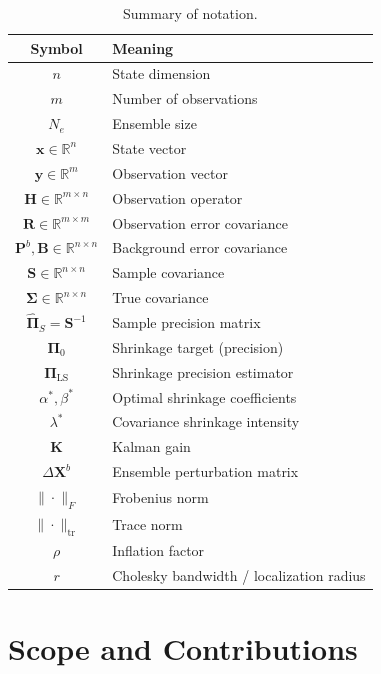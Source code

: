 \begin{table}[htbp]
\centering
\caption{Summary of notation.}
\label{tab:notation}
\begin{tabular}{@{}cl@{}}
\toprule
Symbol & Meaning \\
\midrule
$n$ & State dimension \\
$m$ & Number of observations \\
$N_e$ & Ensemble size \\
$\mathbf{x} \in \mathbb{R}^n$ & State vector \\
$\mathbf{y} \in \mathbb{R}^m$ & Observation vector \\
$\mathbf{H} \in \mathbb{R}^{m \times n}$ & Observation operator \\
$\mathbf{R} \in \mathbb{R}^{m \times m}$ & Observation error covariance \\
$\mathbf{P}^b, \mathbf{B} \in \mathbb{R}^{n \times n}$ & Background error covariance \\
$\mathbf{S} \in \mathbb{R}^{n \times n}$ & Sample covariance \\
$\boldsymbol{\Sigma} \in \mathbb{R}^{n \times n}$ & True covariance \\
$\hat{\boldsymbol{\Pi}}_S = \mathbf{S}^{-1}$ & Sample precision matrix \\
$\boldsymbol{\Pi}_0$ & Shrinkage target (precision) \\
$\boldsymbol{\Pi}_{\text{LS}}$ & Shrinkage precision estimator \\
$\alpha^*, \beta^*$ & Optimal shrinkage coefficients \\
$\lambda^*$ & Covariance shrinkage intensity \\
$\mathbf{K}$ & Kalman gain \\
$\Delta\mathbf{X}^b$ & Ensemble perturbation matrix \\
$\|\cdot\|_F$ & Frobenius norm \\
$\|\cdot\|_{\text{tr}}$ & Trace norm \\
$\rho$ & Inflation factor \\
$r$ & Cholesky bandwidth / localization radius \\
\bottomrule
\end{tabular}
\end{table}

\section{Scope and Contributions}
\label{sec:contributions}

